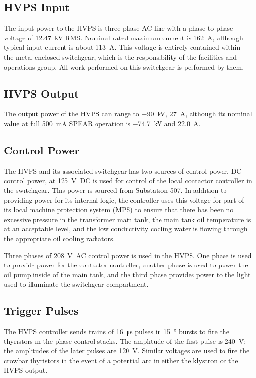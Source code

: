 \documentclass[letterpaper,11pt]{article}
\begin{document}
\subsection{HVPS Input}
The input power to the HVPS is three phase AC line with a phase to phase voltage of \SI{12.47}{\kV} RMS.  Nominal rated maximum current is \SI{162}{\ampere}, although typical input current is about \SI{113}{\ampere}.  This voltage is entirely contained within the metal enclosed switchgear, which is the responsibility of the facilities and operations group.  All work performed on this switchgear is performed by them.

\subsection{HVPS Output}
The output power of the HVPS can range to \SI{-90}{\kV}, \SI{27}{\ampere}, although its nominal value at full \SI{500}{\mA} SPEAR operation is \SI{-74.7}{\kV} and \SI{22.0}{\ampere}.

\subsection{Control Power}
The HVPS and its associated switchgear has two sources of control power.  DC control power, at \SI{125}{\volt DC} is used for control of the local contactor controller in the switchgear.  This power is sourced from Substation 507.  In addition to providing power for its internal logic, the controller uses this voltage for part of its local machine protection system (MPS) to ensure that there has been no excessive pressure in the transformer main tank, the main tank oil temperature is at an acceptable level, and the low conductivity cooling water is flowing through the appropriate oil cooling radiators.

Three phases of \SI{208}{\volt AC} control power is used in the HVPS.  One phase is used to provide power for the contactor controller, another phase is used to power the oil pump inside of the main tank, and the third phase provides power to the light used to illuminate the switchgear compartment.

\subsection{Trigger Pulses}
The HVPS controller sends trains of \SI{16}{\micro\second} pulses in \SI{15}{\degree} bursts to fire the thyristors in the phase control stacks.  The amplitude of the first pulse is \SI{240}{\volt}; the amplitudes of the later pulses are \SI{120}{\volt}.  Similar voltages are used to fire the crowbar thyristors in the event of a potential arc in either the klystron or the HVPS output.
\end{document}
